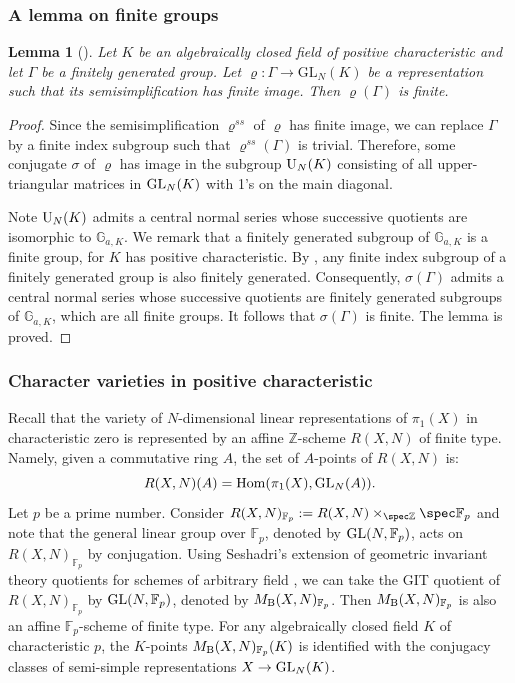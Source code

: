 \documentclass[english]{amsproc}
\theoremstyle{plain}
\newtheorem{lem}[thm]{Lemma}
\theoremstyle{definition}
\theoremstyle{remark}
\theoremstyle{plain}
\numberwithin{equation}{thm} %
\newcommand{\bF}{\mathbb{F}}
\newcommand{\bG}{\mathbb{G}}
\newcommand{\bZ}{\mathbb{Z}}
\newcommand{\GL}{{\rm GL}}
\begin{document}
\subsubsection{A lemma on finite groups}
\begin{lem}[{\cite[Lemma 3.1]{DY23b}}]\label{lem:finite group}
	Let $K$ be an algebraically closed field of positive characteristic and let $\Gamma$ be a finitely generated group. Let $\varrho:\Gamma\to \mathrm{GL}_N(K)$ be a representation such that its semisimplification has finite image. Then $\varrho(\Gamma)$ is finite.
\end{lem}
\begin{proof}
	Since the semisimplification $\varrho^{ss}$ of $\varrho$ has finite image,  we can replace $\Gamma$ by a finite index subgroup such that $\varrho^{ss}(\Gamma)$ is trivial.  Therefore, some conjugate $\sigma$ of $\varrho$ has image in the subgroup ${\rm U}_N(K)$ consisting 
	of all upper-triangular matrices in $\GL_{N}(K)$
	with 1's on the main diagonal.  
	
	Note ${\rm U}_N(K)$  admits a central normal series whose successive
	quotients are isomorphic to $\bG_{a,K}$.  We remark that a finitely generated subgroup  of $\bG_{a,K}$ is a finite group, for $K$ has positive characteristic.
	By \cite[Proposition 4.17]{ST00},   any finite index subgroup   of a finitely generated  group  is also finitely generated.   Consequently,    $\sigma(\Gamma)$ admits a   central normal series whose successive
	quotients are   finitely generated subgroups of $\bG_{a,K}$, which are  all finite groups. 
	It follows that $\sigma(\Gamma)$  is finite. The lemma is proved. 
\end{proof}
\subsubsection{Character varieties in positive characteristic} \label{sec:2.2}   
Recall that the variety of $N$-dimensional linear  representations of $\pi_1(X)$ in characteristic zero is represented by  an affine $\bZ$-scheme $R(X ,N)$ of finite type. 
Namely, given a commutative ring $A$, the set of $A$-points of $R(X ,N)$ is:
$$
R(X ,N)(A)={\rm Hom}(\pi_1(X) , \GL_N(A)).
$$ 
Let $p $ be  a prime number.  
Consider $R(X,N)_{\bF_p}:=R(X ,N)  \times_{\spec \bZ}\spec \bF_p$ and note that the general linear group over $\bF_p$, denoted by $\GL(N,\bF_p)$, acts on $R(X ,N)_{\bF_p}$ by conjugation.  
Using Seshadri's extension of geometric invariant theory quotients for schemes of arbitrary field \cite[Theorem 3]{Ses77}, we can take the GIT quotient
of $R(X ,N)_{\bF_p}$ by $\GL(N,\bF_p)$, denoted by $M_{\rm B}(X ,N)_{\bF_p}$. 
Then $M_{\rm B}(X ,N)_{\bF_p}$  is also an affine $\bF_p$-scheme of finite type.  For any algebraically closed field $K$ of characteristic $p$,   the $K$-points  $M_{\rm B}(X ,N)_{\bF_p}(K)$ is identified with the conjugacy classes of semi-simple representations $X \to \GL_N(K)$.     
\end{document}
